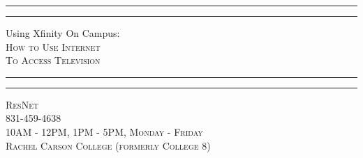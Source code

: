 \documentclass[a4paper, 11pt]{article}
\begin{document}


\begin{titlepage} %

	\centering %
	
	\scshape %
	
	\vspace*{\baselineskip} %
	
	
	\rule{\textwidth}{1.6pt}\vspace*{-\baselineskip}\vspace*{2pt} %
	\rule{\textwidth}{0.4pt} %
	
	\vspace{0.75\baselineskip} %
	
	{\LARGE Using Xfinity On Campus:\\} %
	\vspace{0.5\baselineskip} %
  {\scshape How to Use Internet \\ To Access Television}
	
	\vspace{0.75\baselineskip} %
	
	\rule{\textwidth}{0.4pt}\vspace*{-\baselineskip}\vspace{3.2pt} %
	\rule{\textwidth}{1.6pt} %
	
	\vspace{2\baselineskip} %
	
	
	
	\vspace*{3\baselineskip} %
	
	
	\vspace{0.5\baselineskip} %
	
	\vspace{0.5\baselineskip} %
	
	{\scshape ResNet \\ 831-459-4638 \\
          10AM - 12PM, 1PM - 5PM, Monday - Friday \\
          Rachel Carson College (formerly College 8)
  } %
	
	\vfill %
	

\end{titlepage}
\end{document}
